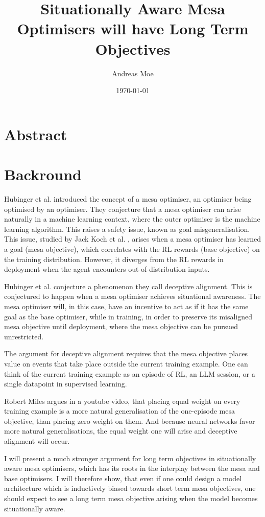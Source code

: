 \documentclass[11pt]{article}
\title{Situationally Aware Mesa Optimisers will have Long Term Objectives}
\author{Andreas Moe}
\date{\today}
\begin{document}
\maketitle

\section*{Abstract}

\section{Backround}\label{sec:backround}

Hubinger et al.\cite{hubinger2021} introduced the concept of a mesa optimiser, an optimiser being optimised by
an optimiser.
They conjecture that a mesa optimiser can arise naturally in a machine learning context, where the outer optimiser is
the machine learning algorithm.
This raises a safety issue, known as goal misgeneralisation.
This issue, studied by Jack Koch et al. \cite{jackkoch2023}, arises when a mesa optimiser has learned a goal
(mesa objective), which correlates with the RL rewards (base objective) on the training distribution.
However, it diverges from the RL rewards in deployment when the agent encounters out-of-distribution inputs.

Hubinger et al.\cite{hubinger2021} conjecture a phenomenon they call deceptive alignment.
This is conjectured to happen when a mesa optimiser achieves situational awareness.
The mesa optimiser will, in this case, have an incentive to act as if it has the same goal as the base optimiser,
while in training, in order to preserve its misaligned mesa objective until deployment, where the mesa objective can be
pursued unrestricted.

The argument for deceptive alignment requires that the mesa objective places value on events that take place outside
the current training example.
One can think of the current training example as an episode of RL, an LLM session, or a single datapoint in supervised
learning.

Robert Miles argues in a youtube video\cite{robertmiles}, that placing equal weight on every training example is a more
natural generalisation of the one-episode mesa objective, than placing zero weight on them.
And because neural networks favor more natural generalisations, the equal weight one will arise and deceptive alignment
will occur.

I will present a much stronger argument for long term objectives in situationally aware mesa optimisers, which has its
roots in the interplay between the mesa and base optimisers.
I will therefore show, that even if one could design a model architecture which is inductively biased towards short term
mesa objectives, one should expect to see a long term mesa objective arising when the model becomes situationally aware.
\end{document}
